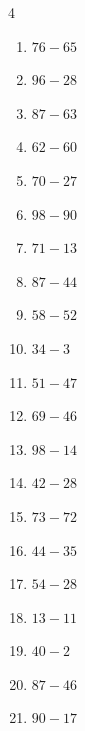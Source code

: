 \begin{multicols}{4}
\begin{enumerate}
  \item $76-65$
        \phantom{$=11$}

  \item $96-28$
        \phantom{$=68$}

  \item $87-63$
        \phantom{$=24$}

  \item $62-60$
        \phantom{$=2$}

  \item $70-27$
        \phantom{$=43$}

  \item $98-90$
        \phantom{$=8$}

  \item $71-13$
        \phantom{$=58$}

  \item $87-44$
        \phantom{$=43$}

  \item $58-52$
        \phantom{$=6$}

  \item $34-3$
        \phantom{$=31$}

  \item $51-47$
        \phantom{$=4$}

  \item $69-46$
        \phantom{$=23$}

  \item $98-14$
        \phantom{$=84$}

\columnbreak %

\resetques

  \item $42-28$
        \phantom{$=14$}

  \item $73-72$
        \phantom{$=1$}

  \item $44-35$
        \phantom{$=9$}

  \item $54-28$
        \phantom{$=26$}

  \item $13-11$
        \phantom{$=2$}

  \item $40-2$
        \phantom{$=38$}

  \item $87-46$
        \phantom{$=41$}

  \item $90-17$
        \phantom{$=73$}


\end{enumerate}
\end{multicols}
